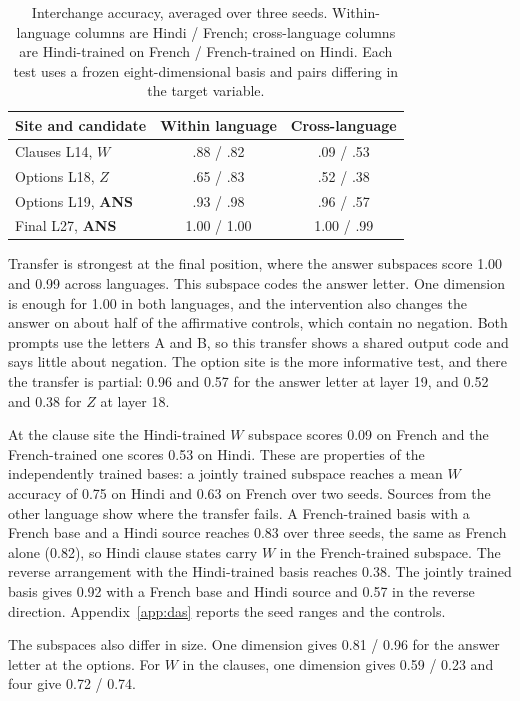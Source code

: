 \documentclass[11pt]{article}
\begin{document}
\begin{table}[t]
\small\centering
\begin{tabularx}{\linewidth}{@{}Xcc@{}}
\toprule
Site and candidate & Within language & Cross-language \\
\midrule
Clauses L14, $W$ & .88 / .82 & .09 / .53 \\
Options L18, $Z$ & .65 / .83 & .52 / .38 \\
Options L19, \textbf{ANS} & .93 / .98 & .96 / .57 \\
Final L27, \textbf{ANS} & 1.00 / 1.00 & 1.00 / .99 \\
\bottomrule
\end{tabularx}
\caption{Interchange accuracy, averaged over three seeds. Within-language columns are Hindi / French; cross-language columns are Hindi-trained on French / French-trained on Hindi. Each test uses a frozen eight-dimensional basis and pairs differing in the target variable.}
\label{tab:das}
\end{table}

Transfer is strongest at the final position, where the answer subspaces score 1.00 and 0.99 across languages. This subspace codes the answer letter. One dimension is enough for 1.00 in both languages, and the intervention also changes the answer on about half of the affirmative controls, which contain no negation. Both prompts use the letters A and B, so this transfer shows a shared output code and says little about negation. The option site is the more informative test, and there the transfer is partial: 0.96 and 0.57 for the answer letter at layer 19, and 0.52 and 0.38 for $Z$ at layer 18.

At the clause site the Hindi-trained $W$ subspace scores 0.09 on French and the French-trained one scores 0.53 on Hindi. These are properties of the independently trained bases: a jointly trained subspace reaches a mean $W$ accuracy of 0.75 on Hindi and 0.63 on French over two seeds. Sources from the other language show where the transfer fails. A French-trained basis with a French base and a Hindi source reaches 0.83 over three seeds, the same as French alone (0.82), so Hindi clause states carry $W$ in the French-trained subspace. The reverse arrangement with the Hindi-trained basis reaches 0.38. The jointly trained basis gives 0.92 with a French base and Hindi source and 0.57 in the reverse direction. Appendix~\ref{app:das} reports the seed ranges and the controls.

The subspaces also differ in size. One dimension gives 0.81 / 0.96 for the answer letter at the options. For $W$ in the clauses, one dimension gives 0.59 / 0.23 and four give 0.72 / 0.74.
\end{document}
